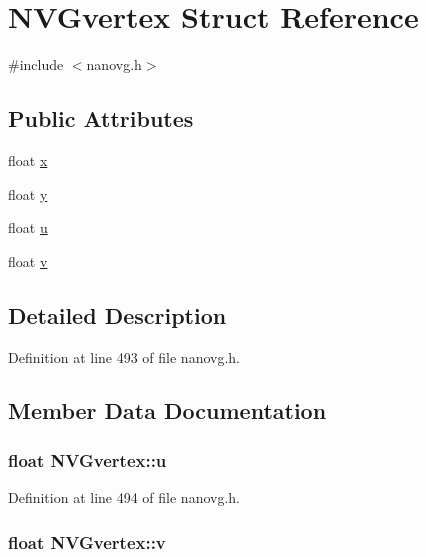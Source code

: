 \hypertarget{struct_n_v_gvertex}{\section{N\+V\+Gvertex Struct Reference}
\label{struct_n_v_gvertex}
}


{\ttfamily \#include $<$nanovg.\+h$>$}

\subsection*{Public Attributes}
\begin{DoxyCompactItemize}
\item 
float \hyperlink{struct_n_v_gvertex_ac0c7b65243540638addff48cfed1b45b}{x}
\item 
float \hyperlink{struct_n_v_gvertex_a41db7ce4c246f4647ee2fb95005980f0}{y}
\item 
float \hyperlink{struct_n_v_gvertex_a088da6dbeb6388326111df98b74e23e4}{u}
\item 
float \hyperlink{struct_n_v_gvertex_a545d3a48f8be2f17850542c4214e7489}{v}
\end{DoxyCompactItemize}


\subsection{Detailed Description}


Definition at line 493 of file nanovg.\+h.



\subsection{Member Data Documentation}
\hypertarget{struct_n_v_gvertex_a088da6dbeb6388326111df98b74e23e4}{
\subsubsection[{u}]{\setlength{\rightskip}{0pt plus 5cm}float N\+V\+Gvertex\+::u}}\label{struct_n_v_gvertex_a088da6dbeb6388326111df98b74e23e4}


Definition at line 494 of file nanovg.\+h.

\hypertarget{struct_n_v_gvertex_a545d3a48f8be2f17850542c4214e7489}{
\subsubsection[{v}]{\setlength{\rightskip}{0pt plus 5cm}float N\+V\+Gvertex\+::v}}\label{struct_n_v_gvertex_a545d3a48f8be2f17850542c4214e7489}


